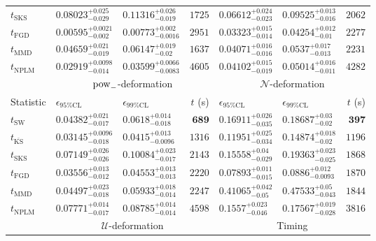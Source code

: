 \begin{tabular}{l|llr|llr}
	$t_{\mathrm{SKS}}$ & $0.08023_{-0.029}^{+0.025}$ & $0.11316_{-0.019}^{+0.026}$ & $1725$ & $0.06612_{-0.023}^{+0.024}$ & $0.09525_{-0.016}^{+0.013}$ & $2062$ \\
	$t_{\mathrm{FGD}}$ & ${\mathbf{0.00595_{-0.002}^{+0.0021}}}$ & ${\mathbf{0.00773_{-0.0016}^{+0.002}}}$ & $2951$ & $0.03323_{-0.014}^{+0.015}$ & ${\mathbf{0.04254_{-0.01}^{+0.012}}}$ & $2277$ \\
	$t_{\mathrm{MMD}}$ & $0.04659_{-0.019}^{+0.021}$ & $0.06147_{-0.02}^{+0.019}$ & $1637$ & $0.04071_{-0.016}^{+0.016}$ & $0.0537_{-0.013}^{+0.017}$ & $2231$ \\
\rowcolor{red!35}	$t_{\mathrm{NPLM}}$ & $0.02919_{-0.014}^{+0.0098}$ & $0.03599_{-0.0083}^{+0.0066}$ & $4605$ & $0.04102_{-0.019}^{+0.015}$ & $0.05014_{-0.011}^{+0.016}$ & $4282$ \\
	\toprule
	\multicolumn{1}{c}{} & \multicolumn{3}{c}{$\rm{pow}_{-}$-deformation} & \multicolumn{3}{c}{$\mathcal{N}$-deformation} \\
Statistic & $\epsilon_{95\%\mathrm{CL}}$ & $\epsilon_{99\%\mathrm{CL}}$ & $t$ (s) & $\epsilon_{95\%\mathrm{CL}}$ & $\epsilon_{99\%\mathrm{CL}}$ & $t$ (s) \\
	\midrule
	$t_{\mathrm{SW}}$ & $0.04382_{-0.017}^{+0.021}$ & $0.0618_{-0.018}^{+0.014}$ & ${\mathbf{689}}$ & $0.16911_{-0.035}^{+0.026}$ & $0.18687_{-0.02}^{+0.03}$ & ${\mathbf{397}}$ \\
	$t_{\overline{\mathrm{KS}}}$ & ${\mathbf{0.03145_{-0.018}^{+0.0096}}}$ & ${\mathbf{0.0415_{-0.0096}^{+0.013}}}$ & $1316$ & $0.11951_{-0.034}^{+0.025}$ & $0.14874_{-0.02}^{+0.018}$ & $1196$ \\
	$t_{\mathrm{SKS}}$ & $0.07149_{-0.026}^{+0.026}$ & $0.10084_{-0.017}^{+0.023}$ & $2143$ & $0.15558_{-0.029}^{+0.04}$ & $0.19363_{-0.025}^{+0.023}$ & $1868$ \\
	$t_{\mathrm{FGD}}$ & $0.03556_{-0.012}^{+0.013}$ & $0.04553_{-0.013}^{+0.013}$ & $2220$ & ${\mathbf{0.07893_{-0.015}^{+0.011}}}$ & ${\mathbf{0.0886_{-0.0093}^{+0.012}}}$ & $1870$ \\
	$t_{\mathrm{MMD}}$ & $0.04497_{-0.018}^{+0.023}$ & $0.05933_{-0.014}^{+0.018}$ & $2247$ & $0.41065_{-0.05}^{+0.042}$ & $0.47533_{-0.043}^{+0.05}$ & $1844$ \\
\rowcolor{red!35}	$t_{\mathrm{NPLM}}$ & $0.07771_{-0.017}^{+0.014}$ & $0.08785_{-0.014}^{+0.014}$ & $4598$ & $0.1557_{-0.046}^{+0.023}$ & $0.17567_{-0.028}^{+0.019}$ & $3816$ \\
	\toprule
	\multicolumn{1}{c}{} & \multicolumn{3}{c}{$\mathcal{U}$-deformation} & \multicolumn{3}{c}{Timing} \\

\end{tabular}
